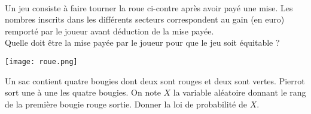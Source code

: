 \documentclass[11pt]{article}
\begin{document}
\begin{exo}~\\[-7mm]
  \begin{minipage}{.6\textwidth}
    Un jeu consiste à faire tourner la roue ci-contre après avoir payé une mise.
    Les nombres inscrits dans les différents secteurs correspondent au gain (en
    euro) remporté par le joueur avant déduction de la mise payée.\\
    Quelle doit être la mise payée par le joueur pour que le jeu soit équitable
    ?
  \end{minipage}
  \begin{minipage}{.4\textwidth}
    \begin{center}
      \texttt{[image: roue.png]}
    \end{center}
  \end{minipage}
\end{exo}

\begin{exo}
  Un sac contient quatre bougies dont deux sont rouges et deux sont vertes.
  Pierrot sort une à une les quatre bougies. On note $X$ la variable aléatoire
  donnant le rang de la première bougie rouge sortie. Donner la loi de
  probabilité de $X$.
\end{exo}
\end{document}
